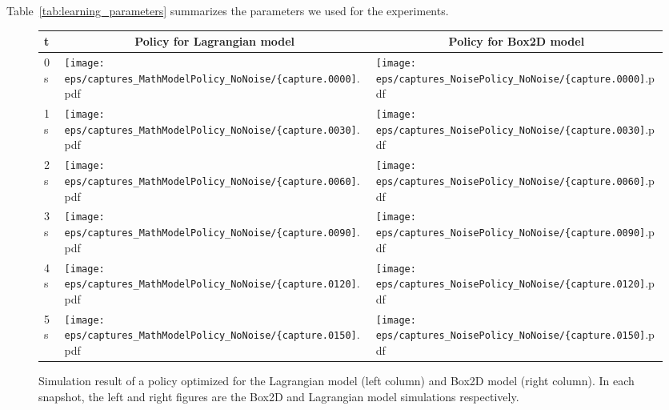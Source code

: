 Table~\ref{tab:learning_parameters} summarizes the parameters we used for the
experiments.

\setlength{\figw}{33mm}
\begin{figure}[tb]
\begin{center}
\begin{tabular}{|l|m{\figw}|m{\figw}|}
\hline
t & \multicolumn{1}{c|}{\footnotesize Policy for Lagrangian model} 
 & \multicolumn{1}{c|}{\footnotesize Policy for Box2D model}\\\hline
0s &
\texttt{[image: eps/captures\_MathModelPolicy\_NoNoise/\{capture.0000]}.pdf} &
\texttt{[image: eps/captures\_NoisePolicy\_NoNoise/\{capture.0000]}.pdf}\\
1s &
\texttt{[image: eps/captures\_MathModelPolicy\_NoNoise/\{capture.0030]}.pdf} &
\texttt{[image: eps/captures\_NoisePolicy\_NoNoise/\{capture.0030]}.pdf}\\
2s &
\texttt{[image: eps/captures\_MathModelPolicy\_NoNoise/\{capture.0060]}.pdf} &
\texttt{[image: eps/captures\_NoisePolicy\_NoNoise/\{capture.0060]}.pdf}\\
3s &
\texttt{[image: eps/captures\_MathModelPolicy\_NoNoise/\{capture.0090]}.pdf} &
\texttt{[image: eps/captures\_NoisePolicy\_NoNoise/\{capture.0090]}.pdf}\\
4s &
\texttt{[image: eps/captures\_MathModelPolicy\_NoNoise/\{capture.0120]}.pdf} &
\texttt{[image: eps/captures\_NoisePolicy\_NoNoise/\{capture.0120]}.pdf}\\
5s &
\texttt{[image: eps/captures\_MathModelPolicy\_NoNoise/\{capture.0150]}.pdf} &
\texttt{[image: eps/captures\_NoisePolicy\_NoNoise/\{capture.0150]}.pdf}\\\hline
\end{tabular}
\caption{Simulation result of a policy optimized for the Lagrangian
 model (left column) and Box2D model (right column).  In each snapshot,
 the left and right figures are the Box2D and Lagrangian model
 simulations respectively.}
\label{fig:learning_example-math-sim}
\end{center}
\end{figure}

